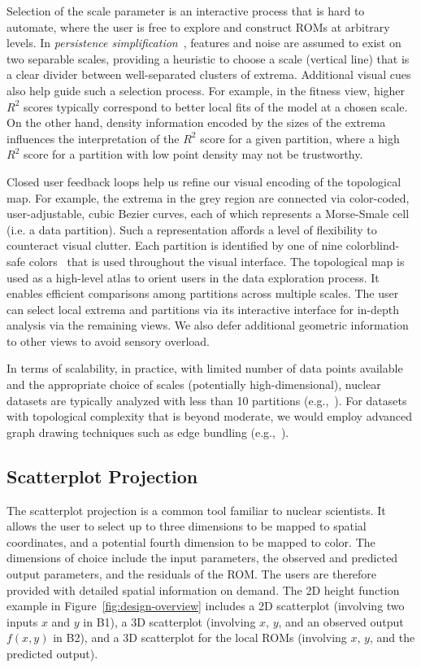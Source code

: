 Selection of the scale parameter is an interactive process that is hard to automate, where the user is free to explore and construct ROMs at arbitrary levels.
%
In \emph{persistence simplification}~\cite{Cohen-SteinerEdelsbrunnerHarer2007,EdelsbrunnerLetscherZomorodian2000}, features and noise are assumed to exist on two separable scales, providing a heuristic to choose a scale (vertical line) that is a clear divider between well-separated clusters of extrema.
%
Additional visual cues also help guide such a selection process.
%
For example, in the fitness view, higher $R^2$ scores typically correspond to better local fits of the model at a chosen scale.
%
On the other hand, density information encoded by the sizes of the extrema  influences the interpretation of the $R^2$ score for a given partition, where a high $R^2$ score for a partition with low point density may not be trustworthy.

Closed user feedback loops help us refine our visual encoding of the topological map.
%
For example, the extrema in the grey region are connected via color-coded, user-adjustable, cubic Bezier curves, each of which represents a Morse-Smale cell (i.e. a data partition).
%
Such a representation affords a level of flexibility to counteract visual clutter.
%
Each partition is identified by one of nine colorblind-safe colors~\cite{Tol2012} that is used throughout
the visual interface.
%
The topological map is used as a high-level atlas to orient users in the data exploration process.
%
It enables efficient comparisons among partitions across multiple scales.
%
The user can select local extrema and partitions via its interactive interface for in-depth analysis via the remaining views.
%
We also defer additional geometric information to other views to avoid sensory overload.

In terms of scalability, in practice, with limited number of data points available and the appropriate choice of scales (potentially high-dimensional), nuclear datasets are typically analyzed with less than 10 partitions (e.g.,~\cite{MaljovecLiuWang2015,MaljovecWangMandelli2013a,MaljovecWangPascucci2013}).
%
For datasets with topological complexity that is beyond moderate, we would employ advanced graph drawing techniques such as edge bundling (e.g.,~\cite{CuiZhouQu2008}).

\subsection{Scatterplot Projection}
\label{sec:scatterPlot}
The scatterplot projection is a common tool familiar to nuclear scientists.
%
It allows the user to select up to three dimensions to be mapped to spatial coordinates, and a potential fourth dimension to be mapped to color.
%
The dimensions of choice include the input parameters, the observed and predicted output parameters, and the residuals of the ROM.
%
The users are therefore provided with detailed spatial information on demand.
%
The 2D height function example in Figure~\ref{fig:design-overview} includes a 2D scatterplot (involving two inputs $x$ and $y$ in B1), a 3D scatterplot (involving $x$, $y$, and an observed output $f(x,y)$ in B2), and a 3D scatterplot for the local ROMs (involving $x$, $y$, and the predicted output).


